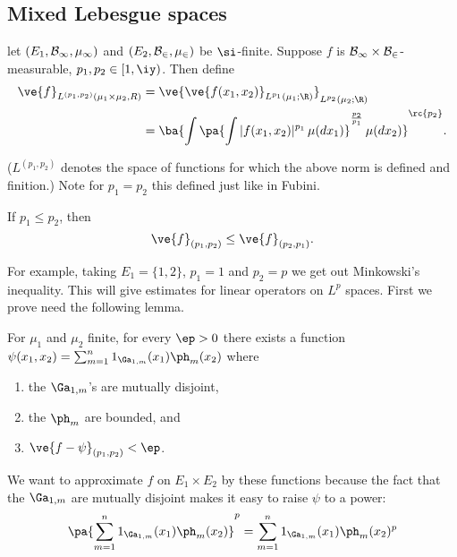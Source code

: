 \subsection{Mixed Lebesgue spaces}
\begin{df}
let $(E_1,\cal B_1,\mu_1)$ and $(E_2,\cal B_2, \mu_2)$ be $\si$-finite.
Suppose $f$ is $\cal B_1\times \cal B_2$-measurable, $p_1,p_2\in [1,\iy)$. 
Then define
\begin{align*}
\ve{f}_{L^{(p_1,p_2)}(\mu_1\times \mu_2, R)} 
&=\ve{
\ve{f(x_1,x_2)}_{L^{p_1}(\mu_1;\R)}
}_{L^{p_2}(\mu_2;\R)}\\
&=\ba{
\int \pa{\int
|f(x_1,x_2)|^{p_1}\,\mu(dx_1)
}^{\frac{p_2}{p_1}}\,\mu(dx_2)
}^{\rc{p_2}}.
\end{align*}
\end{df}
($L^{(p_1,p_2)}$ denotes the space of functions for which the above norm is defined and finition.) Note for $p_1=p_2$ this defined just like in Fubini.
\begin{thm}\label{genmink}
If $p_1\le p_2$, then
\[\ve{f}_{(p_1,p_2)}\le \ve{f}_{(p_2,p_1)}.\]
\end{thm}
For example, taking $E_1=\{1,2\}$, $p_1=1$ and $p_2=p$ we get out Minkowski's inequality.
This will give estimates for linear operators on $L^p$ spaces.
First we prove need the following lemma.
\begin{lem}\label{genminkhelper}
For $\mu_1$ and $\mu_2$ finite, for every $\ep>0$ there exists a function $\psi(x_1,x_2)=\sum_{m=1}^n 1_{\Ga_{1,m}}(x_1)\ph_m(x_2)$ where
\begin{enumerate}
\item the $\Ga_{1,m}$'s are mutually disjoint,
\item the $\ph_m$ are bounded, and
\item $\ve{f-\psi}_{(p_1,p_2)}<\ep$.
\end{enumerate}
\end{lem}
We want to approximate $f$ on $E_1\times E_2$ by these functions because the fact that the $\Ga_{1,m}$ are mutually disjoint makes it easy to raise $\psi$ to a power:
\[
\pa{\sum_{m=1}^n 1_{\Ga_{1,m}}(x_1)\ph_m(x_2)}^p=\sum_{m=1}^n 1_{\Ga_{1,m}}(x_1)\ph_m(x_2)^p
\]

